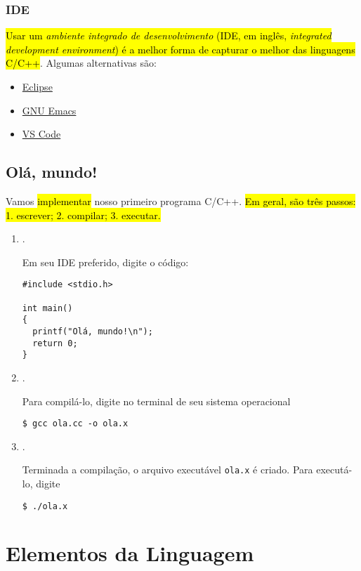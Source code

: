 \documentclass[12pt]{article}
\begin{document}
\subsubsection{IDE}

\hl{Usar um \emph{ambiente integrado de desenvolvimento} (IDE, em inglês, \textit{integrated development environment}) é a melhor forma de capturar o melhor das linguagens C/C++}. Algumas alternativas são:
\begin{itemize}
\item \href{https://www.eclipse.org/ide/}{Eclipse}
\item \href{https://www.gnu.org/software/emacs/download.html}{GNU Emacs}
\item \href{https://code.visualstudio.com/}{VS Code}
\end{itemize}

\subsection{Olá, mundo!}

Vamos \hl{implementar} nosso primeiro programa C/C++. \hl{Em geral, são três passos: 1. escrever; 2. compilar; 3. executar.}

\begin{enumerate}[1.]
\item {}.

  Em seu IDE preferido, digite o código:
\begin{lstlisting}[caption=ola.cc, label=cod:ola]
#include <stdio.h>

int main()
{
  printf("Olá, mundo!\n");
  return 0;
}
\end{lstlisting}
  
\item {}.

Para compilá-lo, digite no terminal de seu sistema operacional
\begin{lstlisting}
$ gcc ola.cc -o ola.x
\end{lstlisting}

\item {}.

Terminada a compilação, o arquivo executável \lstinline+ola.x+ é criado. Para executá-lo, digite
\begin{lstlisting}
$ ./ola.x
\end{lstlisting}  
\end{enumerate}


\section{Elementos da Linguagem}\label{sec_elem}
\end{document}
